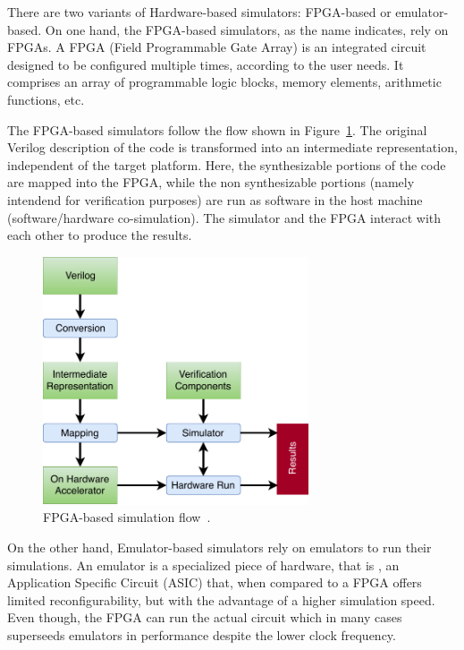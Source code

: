 There are two variants of Hardware-based simulators: FPGA-based or
emulator-based. On one hand, the FPGA-based simulators, as the name indicates,
rely on FPGAs. A FPGA (Field Programmable Gate Array) is an integrated circuit
designed to be configured multiple times, according to the user needs. It
comprises an array of programmable logic blocks, memory elements, arithmetic
functions, etc.

The FPGA-based simulators follow the flow shown in Figure~\ref{fig:fpga}. The
original Verilog description of the code is transformed into an intermediate
representation, independent of the target platform. Here, the synthesizable
portions of the code are mapped into the FPGA, while the non synthesizable
portions (namely intendend for verification purposes) are run as software in the
host machine (software/hardware co-simulation). The simulator and the FPGA
interact with each other to produce the results.

\begin{figure}[!htb]
	\centering
	\includegraphics[width=0.7\textwidth]{Figures/FPGAsim.pdf}
	\caption{FPGA-based simulation flow~\cite{khandelwal:gatelevel}.}
	\label{fig:fpga}
\end{figure}

On the other hand, Emulator-based simulators rely on emulators to run their
simulations. An emulator is a specialized piece of hardware, that is , an
Application Specific Circuit (ASIC) that, when compared to a FPGA offers limited
reconfigurability, but with the advantage of a higher simulation speed. Even
though, the FPGA can run the actual circuit which in many cases superseeds
emulators in performance despite the lower clock frequency.

